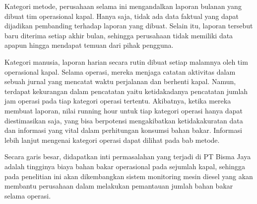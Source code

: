 Kategori metode, perusahaan selama ini mengandalkan laporan bulanan yang dibuat tim operasional kapal. Hanya saja, tidak ada data faktual yang dapat dijadikan pembanding terhadap laporan yang dibuat. Selain itu, laporan tersebut baru diterima setiap akhir bulan, sehingga perusahaan tidak memiliki data apapun hingga mendapat temuan dari pihak pengguna.

Kategori manusia, laporan harian secara rutin dibuat setiap malamnya oleh tim operasional kapal. Selama operasi, mereka menjaga catatan aktivitas dalam sebuah jurnal yang mencatat waktu perjalanan dan berhenti kapal. Namun, terdapat kekurangan dalam pencatatan yaitu ketidakadanya pencatatan jumlah jam operasi pada tiap kategori operasi tertentu. Akibatnya, ketika mereka membuat laporan, nilai running hour untuk tiap kategori operasi hanya dapat diestimasikan saja, yang bisa berpotensi mengakibatkan ketidakakuratan data dan informasi yang vital dalam perhitungan konsumsi bahan bakar. Informasi lebih lanjut mengenai kategori operasi dapat dilihat pada bab metode.

Secara garis besar, didapatkan inti permasalahan yang terjadi di PT Bisma Jaya adalah tingginya biaya bahan bakar operasional pada sejumlah kapal, sehingga pada penelitian ini akan dikembangkan sistem monitoring mesin diesel yang akan membantu perusahaan dalam melakukan pemantauan jumlah bahan bakar selama operasi. 

